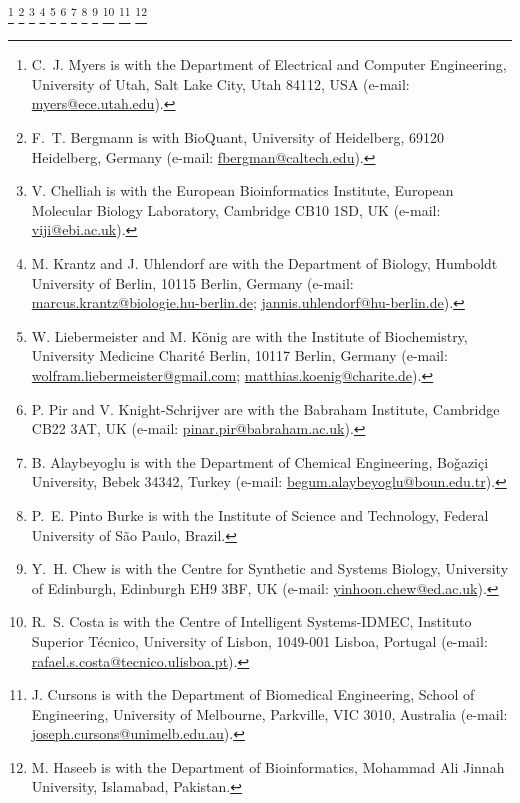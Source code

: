 \documentclass[journal,transmag]{IEEEtran}
\newcommand{\email}[1]{\href{mailto:#1}{#1}}
\begin{document}
{    \thanks{C.~J. Myers is with the Department of Electrical and Computer Engineering, University of Utah, Salt Lake City, Utah 84112, USA (e-mail: \email{myers@ece.utah.edu}).}
    \thanks{F.~T. Bergmann is with BioQuant, University of Heidelberg, 69120 Heidelberg, Germany (e-mail: \email{fbergman@caltech.edu}).} 
    \thanks{V. Chelliah is with the European Bioinformatics Institute, European Molecular Biology Laboratory, Cambridge CB10 1SD, UK (e-mail: \email{viji@ebi.ac.uk}).}  
    \thanks{M. Krantz and J. Uhlendorf are with the Department of Biology, Humboldt University of Berlin, 10115 Berlin, Germany (e-mail: \email{marcus.krantz@biologie.hu-berlin.de}; \email{jannis.uhlendorf@hu-berlin.de}).}
    \thanks{W. Liebermeister and M. K\"{o}nig are with the Institute of Biochemistry, University Medicine Charit\'{e} Berlin, 10117 Berlin, Germany (e-mail: \email{wolfram.liebermeister@gmail.com}; \email{matthias.koenig@charite.de}).}
    \thanks{P. Pir and V. Knight-Schrijver are with the Babraham Institute, Cambridge CB22 3AT, UK (e-mail: \email{pinar.pir@babraham.ac.uk}).}
    \thanks{B. Alaybeyoglu is with the Department of Chemical Engineering, Bo\v{g}azi\c{c}i University, Bebek 34342, Turkey (e-mail: \email{begum.alaybeyoglu@boun.edu.tr}).}
    \thanks{P.~E. Pinto Burke is with the Institute of Science and Technology, Federal University of São Paulo, Brazil.}
    \thanks{Y.~H. Chew is with the Centre for Synthetic and Systems Biology, University of Edinburgh, Edinburgh EH9 3BF, UK (e-mail: \email{yinhoon.chew@ed.ac.uk}).}
    \thanks{R.~S. Costa is with the Centre of Intelligent Systems-IDMEC, Instituto Superior Técnico, University of Lisbon, 1049-001 Lisboa, Portugal (e-mail: \email{rafael.s.costa@tecnico.ulisboa.pt}).}
    \thanks{J. Cursons is with the Department of Biomedical Engineering, School of Engineering, University of Melbourne, Parkville, VIC 3010, Australia (e-mail: \email{joseph.cursons@unimelb.edu.au}).}
    \thanks{M. Haseeb is with the Department of Bioinformatics, Mohammad Ali Jinnah University, Islamabad, Pakistan.}
}
\end{document}
